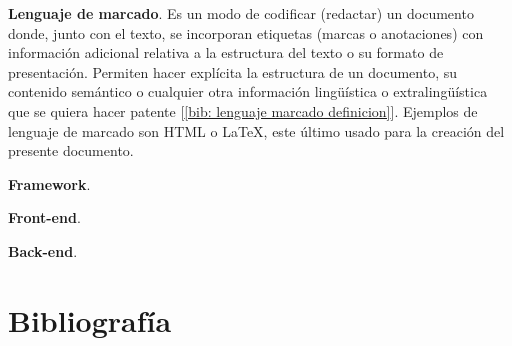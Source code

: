 \documentclass[12pt]{article}
\begin{document}
	\noindent \textbf{\large Lenguaje de marcado}. Es un modo de codificar (redactar) un documento donde, junto con el texto, se incorporan etiquetas (marcas o anotaciones) con información adicional relativa a la estructura del texto o su formato de presentación. Permiten hacer explícita la estructura de un documento, su contenido semántico o cualquier otra información lingüística o extralingüística que se quiera hacer patente [\ref{bib: lenguaje marcado definicion}]. Ejemplos de lenguaje de marcado son HTML o LaTeX, este último usado para la creación del presente documento.
	
	\noindent \textbf{\large Framework}. 
	
	\noindent \textbf{\large Front-end}.
	
	\noindent \textbf{\large Back-end}.  
	
	\pagebreak
	
	\section*{Bibliografía}
	
\end{document}
